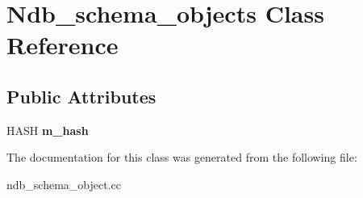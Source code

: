 \hypertarget{classNdb__schema__objects}{}\section{Ndb\+\_\+schema\+\_\+objects Class Reference}
\label{classNdb__schema__objects}
\subsection*{Public Attributes}
\begin{DoxyCompactItemize}
\item 
\mbox{\label{classNdb__schema__objects_a0f98e5d0ee30e9b36a05cd7fac1d07ec}} 
H\+A\+SH {\bfseries m\+\_\+hash}
\end{DoxyCompactItemize}


The documentation for this class was generated from the following file\+:\begin{DoxyCompactItemize}
\item 
ndb\+\_\+schema\+\_\+object.\+cc\end{DoxyCompactItemize}
